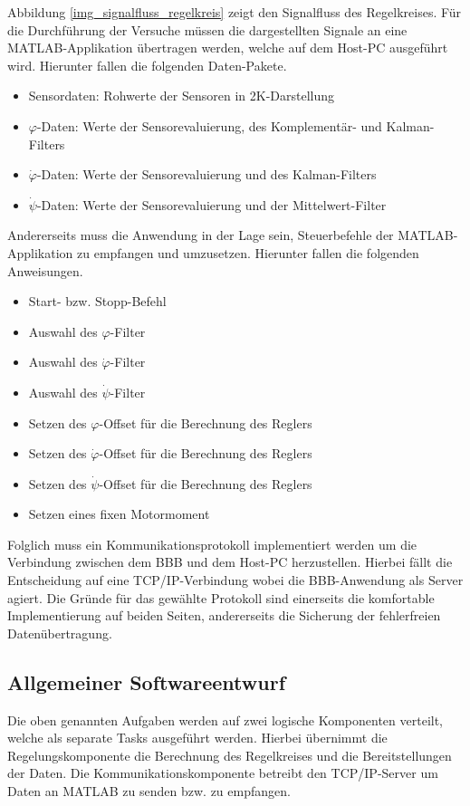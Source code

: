 Abbildung \ref{img_signalfluss_regelkreis} zeigt den Signalfluss des Regelkreises. Für die Durchführung der Versuche müssen die dargestellten Signale an eine MATLAB-Applikation übertragen werden, welche auf dem Host-PC ausgeführt wird. Hierunter fallen die folgenden Daten-Pakete.
\begin{itemize}
\setlength\itemsep{0em}
\item Sensordaten: Rohwerte der Sensoren in 2K-Darstellung
\item $\varphi$-Daten: Werte der Sensorevaluierung, des Komplementär- und Kalman-Filters
\item $\dot{\varphi}$-Daten: Werte der Sensorevaluierung und des Kalman-Filters
\item $\dot{\psi}$-Daten: Werte der Sensorevaluierung und der Mittelwert-Filter
\end{itemize}
Andererseits muss die Anwendung in der Lage sein, Steuerbefehle der MATLAB-Applikation zu empfangen und umzusetzen. Hierunter fallen die folgenden Anweisungen.
\begin{itemize}
\setlength\itemsep{0em}
\item Start- bzw. Stopp-Befehl
\item Auswahl des $\varphi$-Filter
\item Auswahl des $\dot{\varphi}$-Filter
\item Auswahl des $\dot{\psi}$-Filter
\item Setzen des $\varphi$-Offset für die Berechnung des Reglers
\item Setzen des $\dot{\varphi}$-Offset für die Berechnung des Reglers
\item Setzen des $\dot{\psi}$-Offset für die Berechnung des Reglers
\item Setzen eines fixen Motormoment
\end{itemize}
Folglich muss ein Kommunikationsprotokoll implementiert werden um die Verbindung zwischen dem BBB und dem Host-PC herzustellen. Hierbei fällt die Entscheidung auf eine TCP/IP-Verbindung wobei die BBB-Anwendung als Server agiert. Die Gründe für das gewählte Protokoll sind einerseits die komfortable Implementierung auf beiden Seiten, andererseits die Sicherung der fehlerfreien Datenübertragung.

\subsection{Allgemeiner Softwareentwurf}
Die oben genannten Aufgaben werden auf zwei logische Komponenten verteilt, welche als separate Tasks ausgeführt werden. Hierbei übernimmt die Regelungskomponente die Berechnung des Regelkreises und die Bereitstellungen der Daten. Die Kommunikationskomponente betreibt den TCP/IP-Server um Daten an MATLAB zu senden bzw. zu empfangen. 

